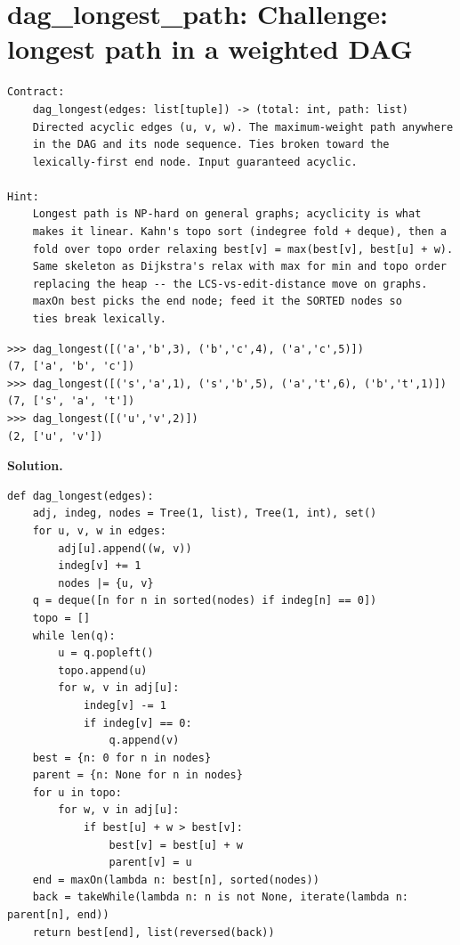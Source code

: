 \documentclass[10pt,letterpaper]{book}
\begin{document}
\section{dag\_longest\_path: Challenge: longest path in a weighted DAG}
\begin{lstlisting}[style=ex]
Contract:
    dag_longest(edges: list[tuple]) -> (total: int, path: list)
    Directed acyclic edges (u, v, w). The maximum-weight path anywhere
    in the DAG and its node sequence. Ties broken toward the
    lexically-first end node. Input guaranteed acyclic.

Hint:
    Longest path is NP-hard on general graphs; acyclicity is what
    makes it linear. Kahn's topo sort (indegree fold + deque), then a
    fold over topo order relaxing best[v] = max(best[v], best[u] + w).
    Same skeleton as Dijkstra's relax with max for min and topo order
    replacing the heap -- the LCS-vs-edit-distance move on graphs.
    maxOn best picks the end node; feed it the SORTED nodes so
    ties break lexically.
\end{lstlisting}
\begin{lstlisting}[style=ex]
>>> dag_longest([('a','b',3), ('b','c',4), ('a','c',5)])
(7, ['a', 'b', 'c'])
>>> dag_longest([('s','a',1), ('s','b',5), ('a','t',6), ('b','t',1)])
(7, ['s', 'a', 't'])
>>> dag_longest([('u','v',2)])
(2, ['u', 'v'])
\end{lstlisting}
\noindent\textbf{Solution.}
\begin{lstlisting}[style=code]
def dag_longest(edges):
    adj, indeg, nodes = Tree(1, list), Tree(1, int), set()
    for u, v, w in edges:
        adj[u].append((w, v))
        indeg[v] += 1
        nodes |= {u, v}
    q = deque([n for n in sorted(nodes) if indeg[n] == 0])
    topo = []
    while len(q):
        u = q.popleft()
        topo.append(u)
        for w, v in adj[u]:
            indeg[v] -= 1
            if indeg[v] == 0:
                q.append(v)
    best = {n: 0 for n in nodes}
    parent = {n: None for n in nodes}
    for u in topo:
        for w, v in adj[u]:
            if best[u] + w > best[v]:
                best[v] = best[u] + w
                parent[v] = u
    end = maxOn(lambda n: best[n], sorted(nodes))
    back = takeWhile(lambda n: n is not None, iterate(lambda n: parent[n], end))
    return best[end], list(reversed(back))
\end{lstlisting}
\end{document}
